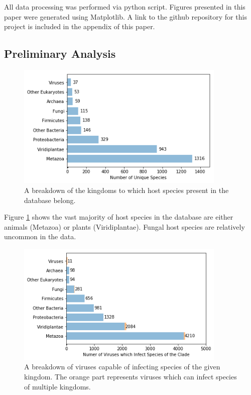 \documentclass[12pt]{article}
\begin{document}
    All data processing was performed via python script. Figures presented in this
    paper were generated using Matplotlib. A link to the github repository for this
    project is included in the appendix of this paper.

    \subsection{Preliminary Analysis}

    \begin{figure}[H]
        \begin{center}
            \includegraphics[width=100mm]{host_clades_figure.png}
            \caption{A breakdown of the kingdoms to which host species present in
            the database belong.}
            \label{host_clades_figure}
        \end{center}
    \end{figure}

    Figure \ref{host_clades_figure} shows the vast majority of host species in
    the database are either animals (Metazoa) or plants (Viridiplantae). Fungal
    host species are relatively uncommon in the data.

    \begin{figure}[H]
        \begin{center}
            \includegraphics[width=100mm]{infects_clades_figure.png}
            \caption{A breakdown of viruses capable of infecting species of
            the given kingdom. The orange part represents viruses which can
            infect species of multiple kingdoms.}
            \label{infects_clades_figure}
        \end{center}
    \end{figure}
\end{document}
